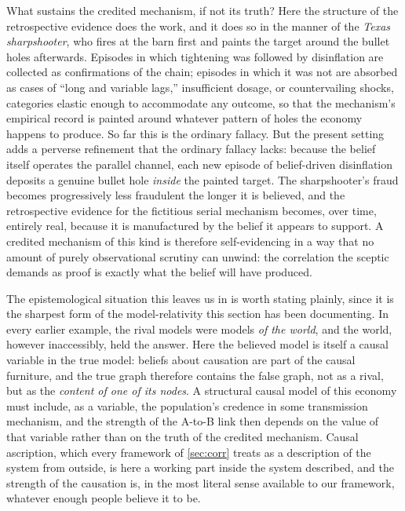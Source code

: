 \documentclass[11pt]{article}
\theoremstyle{definition}
\begin{document}
What sustains the credited mechanism, if not its truth? Here the structure of the retrospective evidence does the work, and it does so in the manner of the \emph{Texas sharpshooter}, who fires at the barn first and paints the target around the bullet holes afterwards. Episodes in which tightening was followed by disinflation are collected as confirmations of the chain; episodes in which it was not are absorbed as cases of ``long and variable lags,'' insufficient dosage, or countervailing shocks, categories elastic enough to accommodate any outcome, so that the mechanism's empirical record is painted around whatever pattern of holes the economy happens to produce. So far this is the ordinary fallacy. But the present setting adds a perverse refinement that the ordinary fallacy lacks: because the belief itself operates the parallel channel, each new episode of belief-driven disinflation deposits a genuine bullet hole \emph{inside} the painted target. The sharpshooter's fraud becomes progressively less fraudulent the longer it is believed, and the retrospective evidence for the fictitious serial mechanism becomes, over time, entirely real, because it is manufactured by the belief it appears to support. A credited mechanism of this kind is therefore self-evidencing in a way that no amount of purely observational scrutiny can unwind: the correlation the sceptic demands as proof is exactly what the belief will have produced.

The epistemological situation this leaves us in is worth stating plainly, since it is the sharpest form of the model-relativity this section has been documenting. In every earlier example, the rival models were models \emph{of the world}, and the world, however inaccessibly, held the answer. Here the believed model is itself a causal variable in the true model: beliefs about causation are part of the causal furniture, and the true graph therefore contains the false graph, not as a rival, but as the \emph{content of one of its nodes}. A structural causal model of this economy must include, as a variable, the population's credence in some transmission mechanism, and the strength of the A-to-B link then depends on the value of that variable rather than on the truth of the credited mechanism. Causal ascription, which every framework of \cref{sec:corr} treats as a description of the system from outside, is here a working part inside the system described, and the strength of the causation is, in the most literal sense available to our framework, whatever enough people believe it to be.
\end{document}
